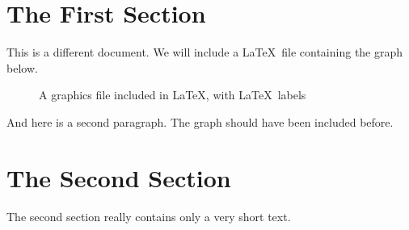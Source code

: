 \documentclass{article}
\begin{document}
\section{The First Section}

This is a different document. We will include a \LaTeX\ file
containing the graph below.

\begin{figure}[h]
  \begin{center}
    
  \end{center}
  \caption{A graphics file included in \LaTeX, with \LaTeX\ labels}
\end{figure}

And here is a second paragraph. The graph should have
been included before.

\section{The Second Section}

The second section really contains only a very short text.
\end{document}
